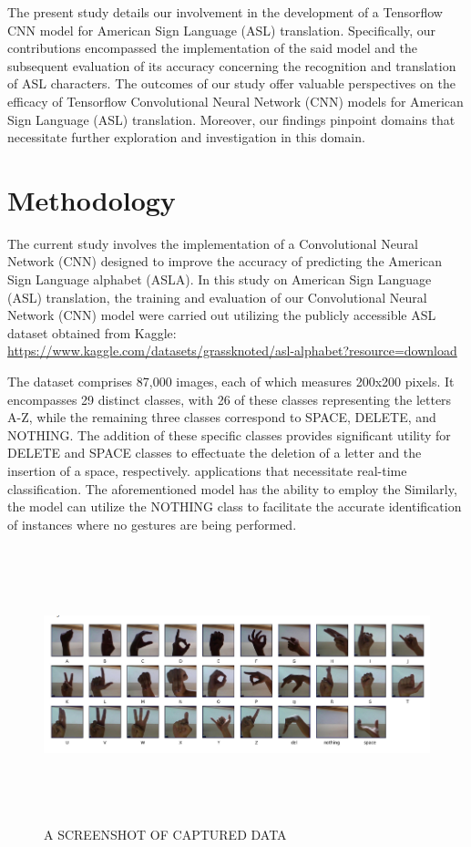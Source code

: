\documentclass[conference]{IEEEtran}
\begin{document}
The present study details our involvement in the development of a Tensorflow CNN model for American Sign Language (ASL) translation. Specifically, our contributions encompassed the implementation of the said model and the subsequent evaluation of its accuracy concerning the recognition and translation of ASL characters. The outcomes of our study offer valuable perspectives on the efficacy of Tensorflow Convolutional Neural Network (CNN) models for American Sign Language (ASL) translation. Moreover, our findings pinpoint domains that necessitate further exploration and investigation in this domain.


\section{Methodology}

The current study involves the implementation of a Convolutional Neural Network (CNN) designed to improve the accuracy of predicting the American Sign Language alphabet (ASLA). In this study on American Sign Language (ASL) translation, the training and evaluation of our Convolutional Neural Network (CNN) model were carried out utilizing the publicly accessible ASL dataset obtained from Kaggle: \url{https://www.kaggle.com/datasets/grassknoted/asl-alphabet?resource=download}

The dataset comprises 87,000 images, each of which measures 200x200 pixels. It encompasses 29 distinct classes, with 26 of these classes representing the letters A-Z, while the remaining three classes correspond to SPACE, DELETE, and NOTHING. The addition of these specific classes provides significant utility for DELETE and SPACE classes to effectuate the deletion of a letter and the insertion of a space, respectively. applications that necessitate real-time classification. The aforementioned model has the ability to employ the Similarly, the model can utilize the NOTHING class to facilitate the accurate identification of instances where no gestures are being performed.

\begin{figure}[t!]
\centering
 \includegraphics[width=\textwidth,height=8cm]{Images/Data.png}
\caption{A SCREENSHOT OF CAPTURED DATA}
\label{Fig:Figure1}
\end{figure}
\end{document}
